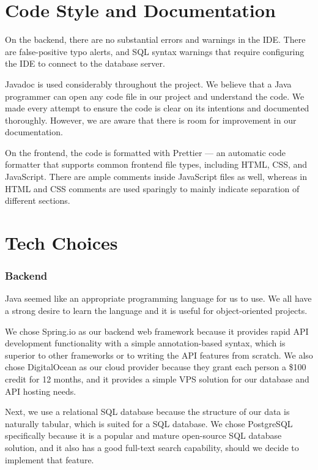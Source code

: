 \documentclass[fontsize=14pt]{article}
\begin{document}
\section*{Code Style and Documentation}

On the backend, there are no substantial errors and warnings in the IDE. There are false-positive typo alerts, and SQL syntax warnings that require configuring the IDE to connect to the database server.

Javadoc is used considerably throughout the project. We believe that a Java programmer can open any code file in our project and understand the code. We made every attempt to ensure the code is clear on its intentions and documented thoroughly. However, we are aware that there is room for improvement in our documentation.

On the frontend, the code is formatted with Prettier — an automatic code formatter that supports common frontend file types, including HTML, CSS, and JavaScript. There are ample comments inside JavaScript files as well, whereas in HTML and CSS comments are used sparingly to mainly indicate separation of different sections.

\section*{Tech Choices} 
\subsubsection*{Backend}
Java seemed like an appropriate programming language for us to use. We all have a strong desire to learn the language and it is useful for object-oriented projects.

We chose Spring.io as our backend web framework because it provides rapid API development functionality with a simple annotation-based syntax, which is superior to other frameworks or to writing the API features from scratch. We also chose DigitalOcean as our cloud provider because they grant each person a \$100 credit for 12 months, and it provides a simple VPS solution for our database and API hosting needs.

Next, we use a relational SQL database because the structure of our data is naturally tabular, which is suited for a SQL database. We chose PostgreSQL specifically because it is a popular and mature open-source SQL database solution, and it also has a good full-text search capability, should we decide to implement that feature.
\end{document}
